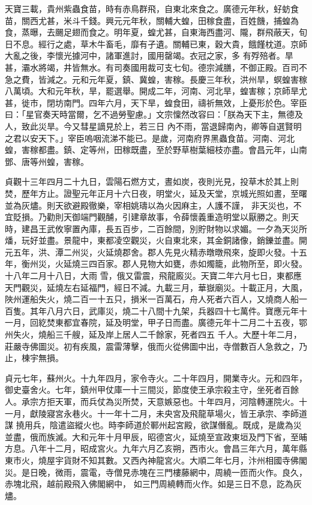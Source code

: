 \begin{pinyinscope}
 天寶三載，貴州紫蟲食苗，時有赤鳥群飛，自東北來食之。廣德元年秋，虸蚄食苗，關西尤甚，米斗千錢。興元元年秋，關輔大蝗，田稼食盡，百姓饑，捕蝗為食，蒸曝，去颺足翅而食之。明年夏，蝗尤甚，自東海西盡河、隴，群飛蔽天，旬日不息。經行之處，草木牛畜毛，靡有孑遺。關輔已東，穀大貴，餓饉枕道。京師大亂之後，李懷光據河中，諸軍進討，國用罄竭。衣冠之家，多
 有殍殕者。旱甚，灞水將竭，井皆無水。有司奏國用裁可支七旬。德宗減膳，不御正殿。百司不急之費，皆減之。元和元年夏，鎮、冀蝗，害稼。長慶三年秋，洪州旱，螟蝗害稼八萬頃。大和元年秋，旱，罷選舉。開成二年，河南、河北旱，蝗害稼；京師旱尤甚，徙市，閉坊南門。四年六月，天下旱，蝗食田，禱祈無效，上憂形於色。宰臣曰：「星官奏天時當爾，乞不過勞聖慮。」文宗懍然改容曰：「朕為天下主，無德及人，致此災旱。今又彗星謫見於上，若三日
 內不雨，當退歸南內，卿等自選賢明之君以安天下。」宰臣嗚咽流涕不能已。是歲，河南府界黑蟲食苗。河南、河北蝗，害稼都盡。鎮、定等州，田稼既盡，至於野草樹葉細枝亦盡。會昌元年，山南鄧、唐等州蝗，害稼。



 貞觀十三年四月二十九日，雲陽石燃方丈，晝如炭，夜則光見，投草木於其上則焚，歷年方止。證聖元年正月十六日夜，明堂火，延及天堂，京城光照如晝，至曙並為灰燼。則天欲避殿徹樂，宰相姚璹以為火因麻主，人護不謹，
 非天災也，不宜貶損。乃勸則天御端門觀酺，引建章故事，令薛懷義重造明堂以厭勝之。則天時，建昌王武攸寧置內庫，長五百步，二百餘間，別貯財物以求媚。一夕為天災所燔，玩好並盡。景龍中，東都凌空觀災，火自東北來，其金銅諸像，銷鑠並盡。開元五年，洪、潭二州災，火延燒郡舍。郡人先見火精赤暾暾飛來，旋即火發。十五年，衡州災，火延燒三四百家。郡人見物大如甕，赤如燭籠，此物所至，即火發。十八年二月十八日，大雨
 雪，俄又雷震，飛龍廄災。天寶二年六月七日，東都應天門觀災，延燒左右延福門，經日不減。九載三月，華嶽廟災。十載正月，大風，陜州運船失火，燒二百一十五只，損米一百萬石，舟人死者六百人，又燒商人船一百隻。其年八月六日，武庫災，燒二十八間十九架，兵器四十七萬件。寶應元年十一月，回紇焚東都宜春院，延及明堂，甲子日而盡。廣德元年十二月二十五夜，鄂州失火，燒船三千艘，延及岸上居人二千餘家，死者四五
 千人。大歷十年二月，莊嚴寺佛圖災。初有疾風，震雷薄擊，俄而火從佛圖中出，寺僧數百人急救之，乃止，棟宇無損。



 貞元七年，蘇州火。十九年四月，家令寺火。二十年四月，開業寺火。元和四年，御史臺舍火。七年，鎮州甲仗庫一十三間災，節度使王承宗殺主守，坐死者百餘人。承宗方拒天軍，而兵仗為災所焚，天意嫉惡也。十年四月，河陰轉運院火。十一月，獻陵寢宮永巷火。十一年十二月，未央宮及飛龍草場火，皆王承宗、李師道謀
 撓用兵，陰遣盜縱火也。時李師道於鄆州起宮殿，欲謀僭亂。既成，是歲為災並盡，俄而族滅。大和元年十月甲辰，昭德宮火，延燒至宣政東垣及門下省，至晡方息。八年十二月，昭成宮火。九年六月乙亥朔，西市火。會昌三年六月，萬年縣東市火，燒屋宇貨財不知其數。又西內神龍宮火。大順二年七月，汴州相國寺佛閣災。是日晚，微雨，震電，寺僧見赤塊在三門樓藤網中，周繞一匝而火作。良久，赤塊北飛，越前殿飛入佛閣網中，
 如三門周繞轉而火作。如是三日不息，訖為灰燼。




\end{pinyinscope}
